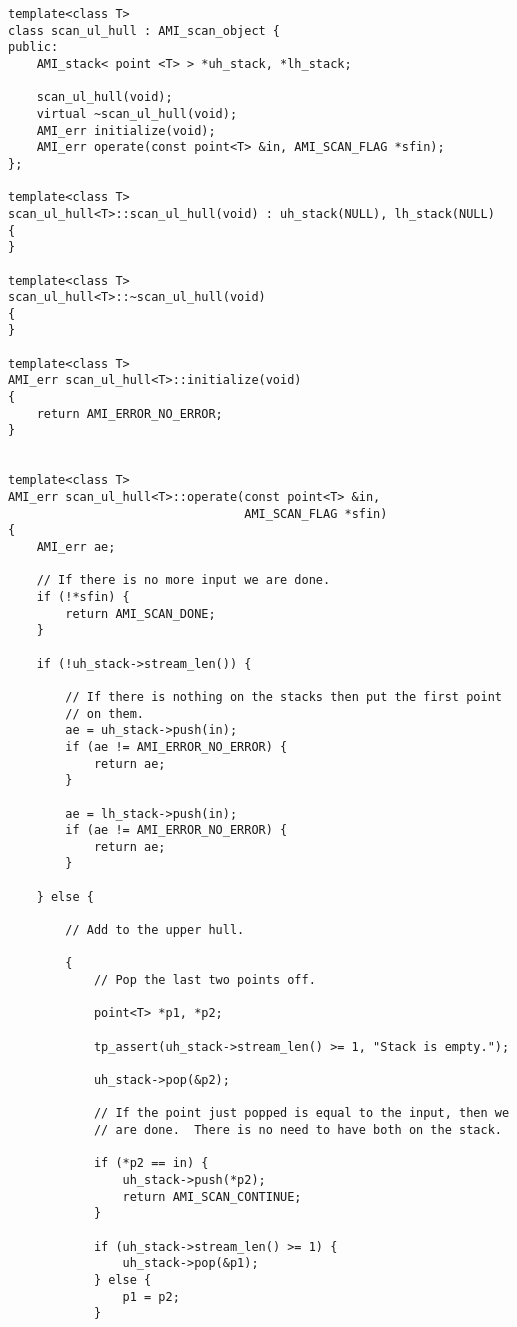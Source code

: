 \begin{verbatim}
template<class T>
class scan_ul_hull : AMI_scan_object {
public:
    AMI_stack< point <T> > *uh_stack, *lh_stack;

    scan_ul_hull(void);
    virtual ~scan_ul_hull(void);
    AMI_err initialize(void);
    AMI_err operate(const point<T> &in, AMI_SCAN_FLAG *sfin);
};

template<class T>
scan_ul_hull<T>::scan_ul_hull(void) : uh_stack(NULL), lh_stack(NULL)
{
}

template<class T>
scan_ul_hull<T>::~scan_ul_hull(void)
{
}

template<class T>
AMI_err scan_ul_hull<T>::initialize(void)
{
    return AMI_ERROR_NO_ERROR;
}


template<class T>
AMI_err scan_ul_hull<T>::operate(const point<T> &in,
                                 AMI_SCAN_FLAG *sfin)
{
    AMI_err ae;

    // If there is no more input we are done.
    if (!*sfin) {
        return AMI_SCAN_DONE;
    }

    if (!uh_stack->stream_len()) {

        // If there is nothing on the stacks then put the first point
        // on them.
        ae = uh_stack->push(in);
        if (ae != AMI_ERROR_NO_ERROR) {
            return ae;
        }

        ae = lh_stack->push(in);
        if (ae != AMI_ERROR_NO_ERROR) {
            return ae;
        }

    } else {

        // Add to the upper hull.

        {
            // Pop the last two points off.

            point<T> *p1, *p2;

            tp_assert(uh_stack->stream_len() >= 1, "Stack is empty.");
            
            uh_stack->pop(&p2);

            // If the point just popped is equal to the input, then we
            // are done.  There is no need to have both on the stack.
            
            if (*p2 == in) {
                uh_stack->push(*p2);
                return AMI_SCAN_CONTINUE;
            }
            
            if (uh_stack->stream_len() >= 1) {
                uh_stack->pop(&p1);
            } else {
                p1 = p2;
            }
            

\end{verbatim}
